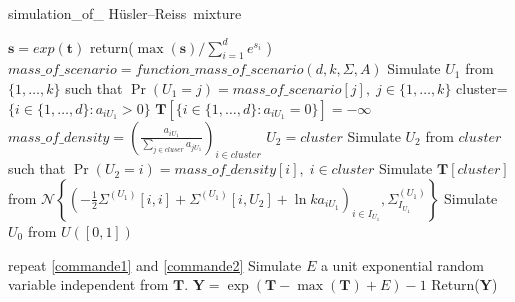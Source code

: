 \documentclass[
]{article}
\begin{document}
\begin{algorithm}[H]
\caption{ simulation\_of\_ Hüsler--Reiss~mixture }
\begin{algorithmic}[1]
\State $\boldsymbol{s}=exp(\boldsymbol{t})$
\State return($\max(\boldsymbol{s}) / \sum_{i=1}^d e^{s_i}$  )
\EndFunction
{} 
\State $mass\_of\_scenario=function\_mass\_of\_scenario(d,k,\Sigma,A)$
\State Simulate $U_1$ from $\{1,\ldots,k\}$ such that $\Pr(U_1=j)=mass\_of\_scenario[j], \; j \in \{1,\ldots,k\}$
\State cluster=$\{i \in \{1,\ldots,d\}: a_{iU_1}>0\}$
\State $\boldsymbol{T}[\{i \in \{1,\ldots,d\}: a_{iU_1}=0\}]=-\infty$
\State $mass\_of\_density=\left(\tfrac{a_{iU_1}}{\sum_{j \in cluser} a_{jU_1}}\right)_{i \in cluster}$
\State $U_2=cluster$
\Else 
\State Simulate $U_2$ from $cluster$ such that $\Pr(U_2=i)=mass\_of\_density[i], \; i \in cluster$
\EndIf
\State Simulate $\boldsymbol{T}[cluster]$ from $\mathcal{N}\left\{\left(-\tfrac{1}{2} \Sigma^{(U_1)}[i,i]+\Sigma^{(U_1)}[i,U_2]+\ln ka_{iU_1}\right)_{i \in I_{U_1}}, \Sigma^{(U_1)}_{I_{U_1}}  \right\}$ \label{commande1}
\State Simulate $U_0$ from $U([0,1])$  \label{commande2}

    \State repeat \ref{commande1} and \ref{commande2}
\EndWhile  
\State Simulate $E$ a unit exponential random variable independent from $\boldsymbol{T}$.
\State $\boldsymbol{Y}=\exp(\boldsymbol{T}-\max(\boldsymbol{T})+E)-1$
\State Return($\boldsymbol{Y}$)


\EndFunction
\end{algorithmic}
\end{algorithm}
\end{document}
